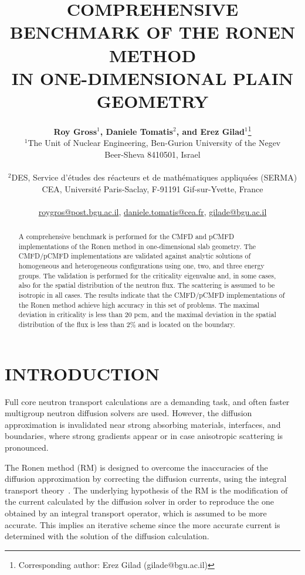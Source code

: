 \documentclass[letterpaper]{mc2021}
\title{COMPREHENSIVE BENCHMARK OF THE RONEN METHOD\\IN ONE-DIMENSIONAL PLAIN GEOMETRY}
\author{%
  \textbf{Roy Gross$^1$, Daniele Tomatis$^2$, and Erez Gilad$^1$}\footnote{Corresponding author: Erez Gilad (gilade@bgu.ac.il)} \\
  $^1$The Unit of Nuclear Engineering, Ben-Gurion University of the Negev\\ Beer-Sheva 8410501, Israel\\
\\
  $^2$DES, Service d'{\'e}tudes des r\'eacteurs et de math\'ematiques appliqu\'ees (SERMA)\\
  CEA, Universit\'e Paris-Saclay, F-91191 Gif-sur-Yvette, France\\ 
\\
  \url{roygros@post.bgu.ac.il}, \url{daniele.tomatis@cea.fr}, \url{gilade@bgu.ac.il}
}
\begin{document}
\maketitle
\justify 

\vspace{-4.5mm}

\begin{abstract}
A comprehensive benchmark is performed for the CMFD and pCMFD implementations of the Ronen method in one-dimensional slab geometry. The CMFD/pCMFD implementations are validated against analytic solutions of homogeneous and heterogeneous configurations using one, two, and three energy groups. The validation is performed for the criticality eigenvalue and, in some cases, also for the spatial distribution of the neutron flux. The scattering is assumed to be isotropic in all cases. The results indicate that the CMFD/pCMFD implementations of the Ronen method achieve high accuracy in this set of problems. The maximal deviation in criticality is less than 20 pcm, and the maximal deviation in the spatial distribution of the flux is less than 2\% and is located on the boundary.  
\end{abstract}

\section{INTRODUCTION} 
\label{sec:intro}

Full core neutron transport calculations are a demanding task, and often faster multigroup neutron diffusion solvers are used. However, the diffusion approximation is invalidated near strong absorbing materials, interfaces, and boundaries, where strong gradients appear or in case anisotropic scattering is pronounced. 

\vspace{-1.5mm}

The Ronen method (RM) is designed to overcome the inaccuracies of the diffusion approximation by correcting the diffusion currents, using the integral transport theory~\cite{Tomatis-2011,Gross-2020,Tomatis-2020}. The underlying hypothesis of the RM is the modification of the current calculated by the diffusion solver in order to reproduce the one obtained by an integral transport operator, which is assumed to be more accurate. This implies an iterative scheme since the more accurate current is determined with the solution of the diffusion calculation.
\end{document}

